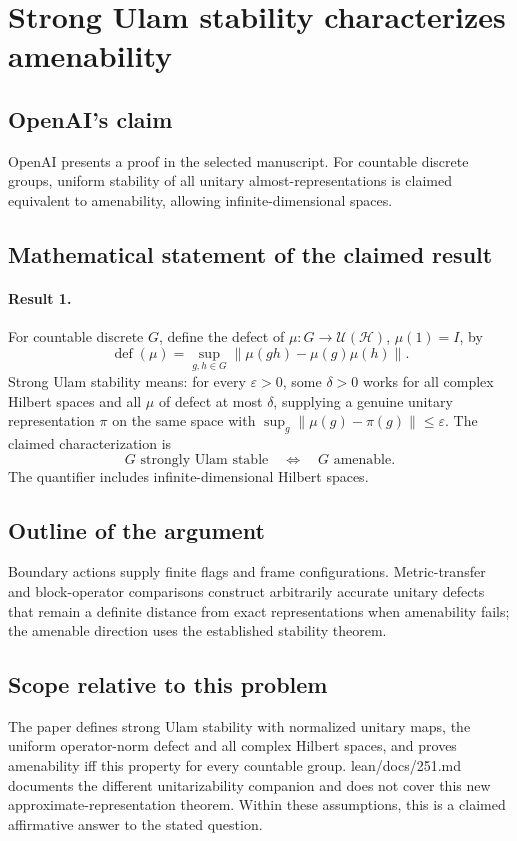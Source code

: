 \documentclass[11pt]{article}
\begin{document}
\section*{Strong Ulam stability characterizes amenability}

\subsection{OpenAI's claim}
OpenAI presents a proof in the selected manuscript. For countable discrete groups, uniform stability of all unitary almost-representations is claimed equivalent to amenability, allowing infinite-dimensional spaces.

\subsection{Mathematical statement of the claimed result}
\paragraph{Result 1.} For countable discrete \(G\), define the defect of \(\mu:G\to\mathcal U(\mathcal H)\), \(\mu(1)=I\), by
\[
 \operatorname{def}(\mu)=\sup_{g,h\in G}\|\mu(gh)-\mu(g)\mu(h)\|.
\]
Strong Ulam stability means: for every \(\varepsilon>0\), some \(\delta>0\) works for all complex Hilbert spaces and all \(\mu\) of defect at most \(\delta\), supplying a genuine unitary representation \(\pi\) on the same space with \(\sup_g\|\mu(g)-\pi(g)\|\le\varepsilon\). The claimed characterization is
\[
 G\text{ strongly Ulam stable}\quad\Longleftrightarrow\quad G\text{ amenable}.
\]
The quantifier includes infinite-dimensional Hilbert spaces.

\subsection{Outline of the argument}
Boundary actions supply finite flags and frame configurations. Metric-transfer and block-operator comparisons construct arbitrarily accurate unitary defects that remain a definite distance from exact representations when amenability fails; the amenable direction uses the established stability theorem.

\subsection{Scope relative to this problem}
The paper defines strong Ulam stability with normalized unitary maps, the uniform operator-norm defect and all complex Hilbert spaces, and proves amenability iff this property for every countable group. lean/docs/251.md documents the different unitarizability companion and does not cover this new approximate-representation theorem. Within these assumptions, this is a claimed affirmative answer to the stated question.
\end{document}
